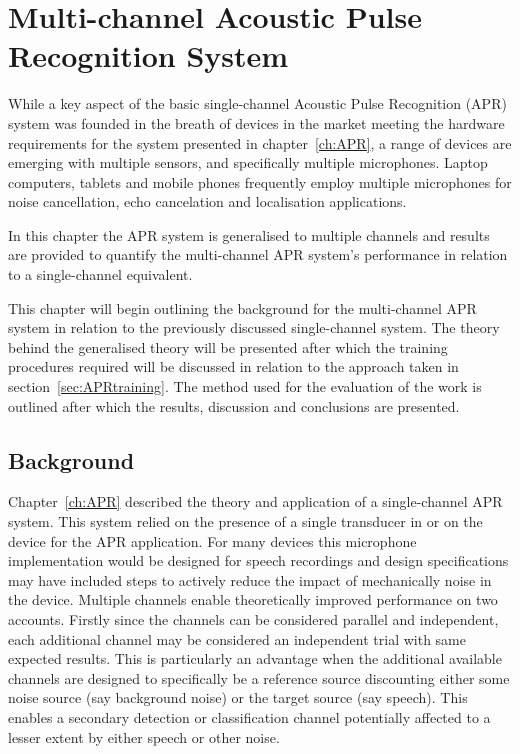 \chapter{Multi-channel Acoustic Pulse Recognition System}\label{ch:MultichannelAPR}

\ifpdf
    \graphicspath{{Chapter4_MultiAPR/Chapter4Figs/PNG/}{Chapter4_MultiAPR/Chapter4Figs/PDF/}{Chapter4_MultiAPR/Chapter4Figs/}{Chapter4_MultiAPR/Chapter4Figs/Training/}}
\else
    \graphicspath{{Chapter4_MultiAPR/Chapter4Figs/EPS/}{Chapter4_MultiAPR/Chapter4Figs/}}
\fi

While a key aspect of the basic single-channel Acoustic Pulse Recognition (APR) system was founded in the breath of devices in the market meeting the hardware requirements for the system presented in chapter~\ref{ch:APR}, a range of devices are emerging with multiple sensors, and specifically multiple microphones. Laptop computers, tablets and mobile phones frequently employ multiple microphones for noise cancellation\cite{Habets2013}\cite{Habets2012}, echo cancelation\cite{US7925007} and localisation applications\cite{US8174547}\cite{US8233353}.

In this chapter the APR system is generalised to multiple channels and results are provided to quantify the multi-channel APR system's performance in relation to a single-channel equivalent.

This chapter will begin outlining the background for the multi-channel APR system in relation to the previously discussed single-channel system. The theory behind the generalised theory will be presented after which the training procedures required will be discussed in relation to the approach taken in section~\ref{sec:APRtraining}. The method used for the evaluation of the work is outlined after which the results, discussion and conclusions are presented.

\section{Background}
Chapter~\ref{ch:APR} described the theory and application of a single-channel APR system. This system relied on the presence of a single transducer in or on the device for the APR application. For many devices this microphone implementation would be designed for speech recordings and design specifications may have included steps to actively reduce the impact of mechanically noise in the device. Multiple channels enable theoretically improved performance on two accounts. Firstly since the channels can be considered parallel and independent, each additional channel may be considered an independent trial with same expected results. This is particularly an advantage when the additional available channels are designed to specifically be a reference source discounting either some noise source (say background noise) or the target source (say speech). This enables a secondary detection or classification channel potentially affected to a lesser extent by either speech or other noise.

